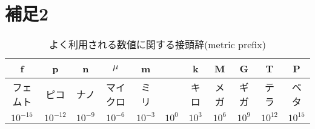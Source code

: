 \documentclass[11pt,a4j]{mybook2}
\begin{document}
\section{補足2}
\begin{table}[h]
\begin{center}
\caption{よく利用される数値に関する接頭辞(metric prefix)}
\label{tbl:prefix}
\begin{tabular}{c|c|c|c|c|c|c|c|c|c|c}
f & p & n & $\mu$ & m & & k & M & G & T & P \\
\hline
フェムト & ピコ& ナノ & マイクロ & ミリ & & キロ & メガ& ギガ& テラ & ペタ\\
\hline
$10^{-15}$ &
$10^{-12}$&
$10^{-9}$ &
$10^{-6}$ &
$10^{-3}$ &
$10^0$ &
$10^3$ &
$10^6$ &
$10^9$ &
$10^{12}$&
$10^{15}$ 
\end{tabular}
\end{center}
\end{table}
\end{document}
